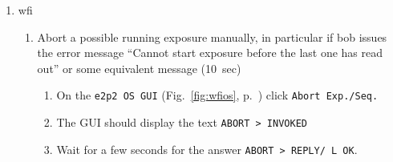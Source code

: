 \documentclass[11pt,fleqn]{book}
\def\figref#1{Fig.~\ref{fig:#1}, p.~\pageref{fig:#1}}
\begin{document}
\begin{enumerate}
\begin{enumerate}
\begin{enumerate}
       \end{enumerate}
       \item Ensure only one \gls{bob} is running
         \begin{enumerate}
           \item Find all \glspl{bob} (\texttt{ps gaux | grep bob})
           \item \texttt{kill} them
           \item launch a new \gls{bob}.
         \end{enumerate}
       \item \textit{(\gls{grond})} Restart \gls{fiera} (see ~\ref{restartfiera}).
       \item \textit{(\gls{grond})} Restart \gls{grond}.
         \begin{enumerate}
           \item Type \texttt{grinsStop}
           \item Type \texttt{grinsStart}
           \item In \texttt{GROND Control} panel, put instrument \texttt{ONLINE}.
         \end{enumerate}
       \item \textit{(\gls{grond})} Reboot \gls{grond}.
       \item \textit{(\gls{grond})} If the GROND control has many TCS-related fields with gray background or the error says something about the FITS keyword TELESCOP, a last resort reboot of GROND may be needed. \textbf{BUT} in case of the first scenario, take a separate exposure with \gls{fiera} (in the control panel) first and check if these fields turn back to their usual color.
     \end{enumerate}
  \item\label{list:wfiexpocrash} \gls{wfi}
    \begin{enumerate}
      \item Abort a possible running exposure manually, in particular if \gls{bob} issues the error message
             ``Cannot start exposure before the last one has read out'' or some
             equivalent message (10~sec)
        \begin{enumerate}
           \item On the \texttt{e2p2 OS GUI} (\figref{wfios}) click \texttt{Abort Exp./Seq.}
           \item The GUI should display the text \texttt{ABORT    > INVOKED}
           \item Wait for a few seconds for the answer \texttt{ABORT    > REPLY/ L   OK}.

\end{enumerate}
\end{enumerate}
\end{enumerate}
\end{document}
